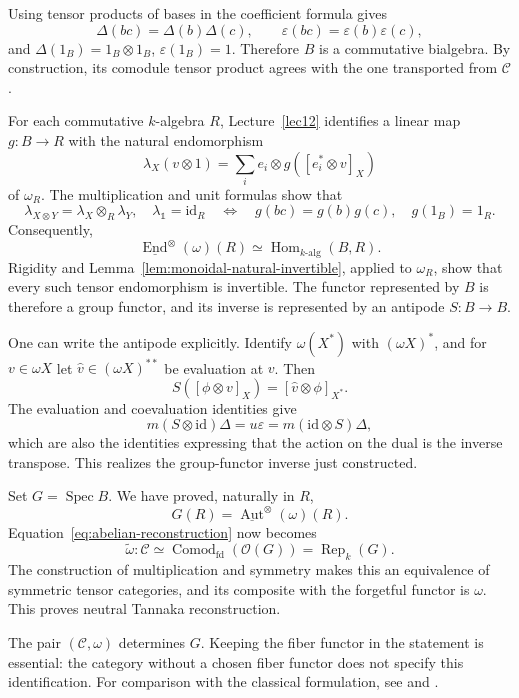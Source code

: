 Using tensor products of bases in the coefficient formula gives
\[
 \Delta(bc)=\Delta(b)\Delta(c),\qquad
 \varepsilon(bc)=\varepsilon(b)\varepsilon(c),
\]
and $\Delta(1_B)=1_B\otimes1_B$, $\varepsilon(1_B)=1$. Therefore $B$ is a commutative bialgebra. By construction, its comodule tensor product agrees with the one transported from $\mathcal C$.

For each commutative $k$-algebra $R$, Lecture~\ref{lec12} identifies a linear map $g:B\to R$ with the natural endomorphism
\[
 \lambda_X(v\otimes1)=\sum_i e_i\otimes g([e_i^*\otimes v]_X)
\]
of $\omega_R$. The multiplication and unit formulas show that
\[
 \lambda_{X\otimes Y}=\lambda_X\otimes_R\lambda_Y,
 \quad\lambda_{\mathbb{1}}=\mathrm{id}_R
 \quad\Longleftrightarrow\quad
 g(bc)=g(b)g(c),\quad g(1_B)=1_R.
\]
Consequently,
\[
 \underline{\operatorname{End}}^{\otimes}(\omega)(R)
 \simeq\operatorname{Hom}_{k\text{-alg}}(B,R).
\]
Rigidity and Lemma~\ref{lem:monoidal-natural-invertible}, applied to $\omega_R$, show that every such tensor endomorphism is invertible. The functor represented by $B$ is therefore a group functor, and its inverse is represented by an antipode $S:B\to B$.

One can write the antipode explicitly. Identify $\omega(X^*)$ with $(\omega X)^*$, and for $v\in\omega X$ let $\widehat v\in(\omega X)^{**}$ be evaluation at $v$. Then
\[
 S([\phi\otimes v]_X)=[\widehat v\otimes\phi]_{X^*}.
\]
The evaluation and coevaluation identities give
\[
 m(S\otimes\mathrm{id})\Delta=u\varepsilon
 =m(\mathrm{id}\otimes S)\Delta,
\]
which are also the identities expressing that the action on the dual is the inverse transpose. This realizes the group-functor inverse just constructed.

Set $G=\operatorname{Spec}B$. We have proved, naturally in $R$,
\[
 G(R)=\underline{\operatorname{Aut}}^{\otimes}(\omega)(R).
\]
Equation~\eqref{eq:abelian-reconstruction} now becomes
\[
 \widetilde\omega:\mathcal C\simeq
 \operatorname{Comod}_{\mathrm{fd}}(\mathcal O(G))
 =\operatorname{Rep}_k(G).
\]
The construction of multiplication and symmetry makes this an equivalence of symmetric tensor categories, and its composite with the forgetful functor is $\omega$. This proves neutral Tannaka reconstruction.

\begin{remark}
The pair $(\mathcal C,\omega)$ determines $G$. Keeping the fiber functor in the statement is essential: the category without a chosen fiber functor does not specify this identification. For comparison with the classical formulation, see \cite[Chapter X, Section 3]{milneAGS} and \cite[Section 5.4]{EGNO}.
\end{remark}
